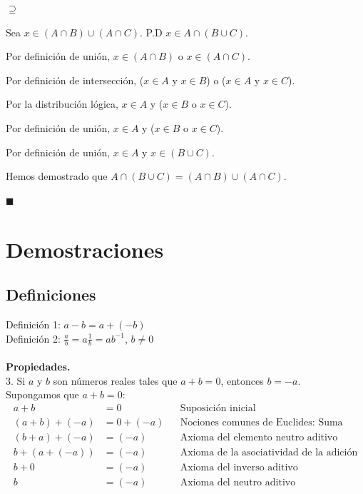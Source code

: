 \documentclass{article}
\begin{document}
\(\supseteq\)

Sea \(x \in (A \cap B) \cup (A \cap C)\). P.D \(x \in A \cap (B \cup C)\).

Por definición de unión, \(x \in (A \cap B)\) o \(x \in (A \cap C)\).

Por definición de intersección, (\(x \in A\) y \(x \in B\)) o (\(x \in A\) y \(x \in C\)).

Por la distribución lógica, \(x \in A\) y (\(x \in B\) o \(x \in C\)).

Por definición de unión, \(x \in A\) y (\(x \in B\) o \(x \in C\)).

Por definición de unión, \(x \in A\) y \(x \in (B \cup C)\).

Hemos demostrado que \(A \cap (B \cup C) = (A \cap B) \cup (A \cap C)\).

\(\blacksquare\)


\newpage
\section*{Demostraciones}

\subsection*{Definiciones}

Definición 1: \(a-b=a+(-b)\)
{}\\
Definición 2: \(\frac{a}{b}=a\frac{1}{b} = ab^{-1}\), \(b\neq 0\) \\\\

\noindent \textbf{Propiedades.} \\
3. Si \(a\) y \(b\) son números reales tales que \(a+b=0\), entonces \(b=-a\). \\
Supongamos que \(a+b=0\):
\begin{align*}
    a + b &= 0 && \text{Suposición inicial} \\
    (a + b) + (-a) &= 0 + (-a) && \text{Nociones comunes de Euclides: Suma} \\
    (b + a) + (-a) &= (-a) && \text{Axioma del elemento neutro aditivo} \\
    b + (a + (-a)) &= (-a) && \text{Axioma de la asociatividad de la adición} \\
    b + 0 &= (-a) && \text{Axioma del inverso aditivo} \\
    b &= (-a) && \text{Axioma del neutro aditivo}
\end{align*}
\end{document}

